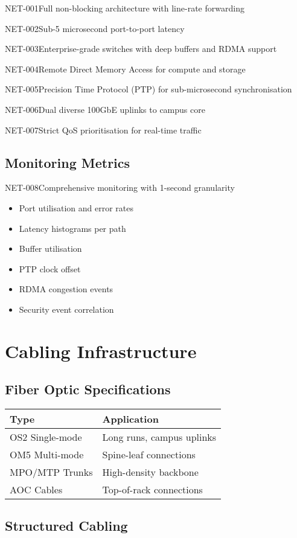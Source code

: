 \begin{requirement}{NET-001}{Full non-blocking architecture with line-rate forwarding}
\begin{requirement}{NET-002}{Sub-5 microsecond port-to-port latency}
\begin{requirement}{NET-003}{Enterprise-grade switches with deep buffers and RDMA support}
\begin{requirement}{NET-004}{Remote Direct Memory Access for compute and storage}
\begin{requirement}{NET-005}{Precision Time Protocol (PTP) for sub-microsecond synchronisation}
\begin{requirement}{NET-006}{Dual diverse 100GbE uplinks to campus core}
\begin{requirement}{NET-007}{Strict QoS prioritisation for real-time traffic}
\subsection{Monitoring Metrics}

\begin{requirement}{NET-008}{Comprehensive monitoring with 1-second granularity}

\begin{itemize}
    \item Port utilisation and error rates
    \item Latency histograms per path
    \item Buffer utilisation
    \item PTP clock offset
    \item RDMA congestion events
    \item Security event correlation
\end{itemize}

\section{Cabling Infrastructure}

\subsection{Fiber Optic Specifications}

\begin{table}[H]
\centering
\begin{tabularx}{\textwidth}{@{}lX@{}}
\toprule
\textbf{Type} & \textbf{Application} \\
\midrule
OS2 Single-mode & Long runs, campus uplinks \\
OM5 Multi-mode & Spine-leaf connections \\
MPO/MTP Trunks & High-density backbone \\
AOC Cables & Top-of-rack connections \\
\bottomrule
\end{tabularx}
\end{table}

\subsection{Structured Cabling}


\end{requirement}
\end{requirement}
\end{requirement}
\end{requirement}
\end{requirement}
\end{requirement}
\end{requirement}
\end{requirement}
